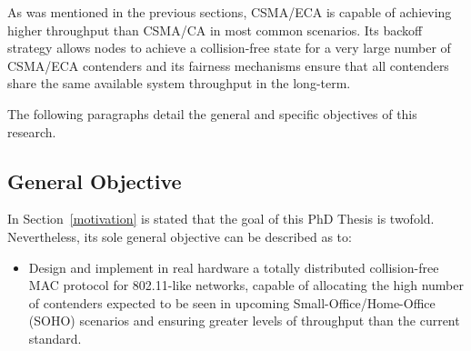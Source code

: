 As was mentioned in the previous sections, CSMA/ECA is capable of achieving higher throughput than CSMA/CA in most common scenarios. Its backoff strategy allows nodes to achieve a collision-free state for a very large number of CSMA/ECA contenders and its fairness mechanisms ensure that all contenders share the same available system throughput in the long-term.

The following paragraphs detail the general and specific objectives of this research. 

\subsection{General Objective}
In Section~\ref{motivation} is stated that the goal of this PhD Thesis is twofold. Nevertheless, its sole general objective can be described as to:
\begin{itemize}
	\item Design and implement in real hardware a totally distributed collision-free MAC protocol for 802.11-like networks, capable of allocating the high number of contenders expected to be seen in upcoming Small-Office/Home-Office (SOHO) scenarios and ensuring greater levels of throughput than the current standard.
\end{itemize}

